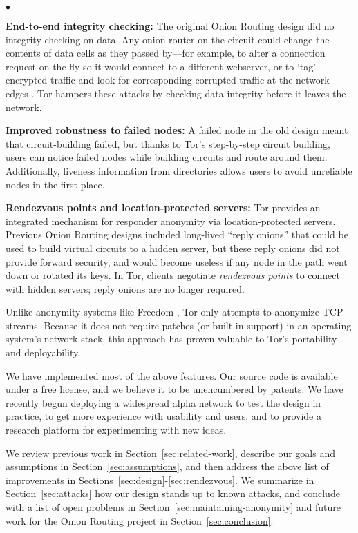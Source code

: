 \documentclass[times,10pt,twocolumn]{article}
\newenvironment{tightlist}{\begin{list}{$\bullet$}{
  \setlength{\itemsep}{0mm}
    \setlength{\parsep}{0mm}
    }}{\end{list}}
\begin{document}
\begin{tightlist}
\item \textbf{End-to-end integrity checking:} The original Onion Routing
design did no integrity checking on data. Any onion router on the
circuit could change the contents of data cells as they passed by---for
example, to alter a connection request on the fly so it would connect
to a different webserver, or to `tag' encrypted traffic and look for
corresponding corrupted traffic at the network edges \cite{minion-design}.
Tor hampers these attacks by checking data integrity before it leaves
the network.

\item \textbf{Improved robustness to failed nodes:} A failed node
in the old design meant that circuit-building failed, but thanks to
Tor's step-by-step circuit building, users can notice failed nodes
while building circuits and route around them. Additionally, liveness
information from directories allows users to avoid unreliable nodes in
the first place.

\item \textbf{Rendezvous points and location-protected servers:}
Tor provides an integrated mechanism for responder anonymity via
location-protected servers.  Previous Onion Routing designs included
long-lived ``reply onions'' that could be used to build virtual circuits
to a hidden server, but these reply onions did not provide forward
security, and would become useless if any node in the path went down
or rotated its keys.  In Tor, clients negotiate {\it rendezvous points}
to connect with hidden servers; reply onions are no longer required.
\end{tightlist}

Unlike anonymity systems like Freedom \cite{freedom2-arch}, Tor only
attempts to anonymize TCP streams. Because it does not require patches
(or built-in support) in an operating system's network stack, this
approach has proven valuable to Tor's portability and deployability.

We have implemented most of the above features. Our source code is
available under a free license, and we believe it to be unencumbered by
patents. We have recently begun deploying a widespread alpha network
to test the design in practice, to get more experience with usability
and users, and to provide a research platform for experimenting with
new ideas.

We review previous work in Section~\ref{sec:related-work}, describe
our goals and assumptions in Section~\ref{sec:assumptions},
and then address the above list of improvements in
Sections~\ref{sec:design}-\ref{sec:rendezvous}. We summarize
in Section~\ref{sec:attacks} how our design stands up to
known attacks, and conclude with a list of open problems in
Section~\ref{sec:maintaining-anonymity} and future work for the Onion
Routing project in Section~\ref{sec:conclusion}.
\end{document}
